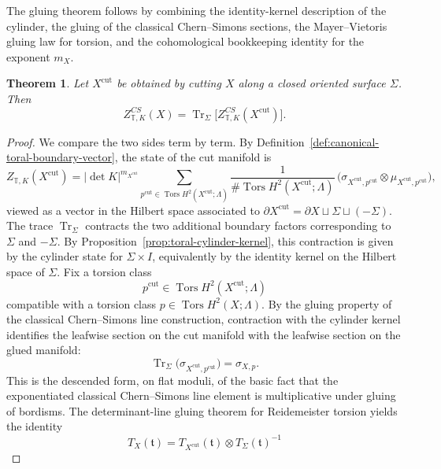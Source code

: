 \documentclass[12pt]{amsart}
\numberwithin{equation}{section}
\newtheorem{theorem}{Theorem}[section]
\DeclareMathOperator{\Tr}{Tr}
\begin{document}
The gluing theorem follows by combining the identity-kernel description of the cylinder, the gluing of the
classical Chern--Simons sections, the Mayer--Vietoris gluing law for torsion, and the cohomological
bookkeeping identity for the exponent $m_X$.

\begin{theorem}
\label{thm:Componentwise-toral-gluing}
Let $X^{\mathrm{cut}}$ be obtained by cutting $X$ along a closed oriented
surface $\Sigma$.
Then
\[
Z^{CS}_{\mathbb T,K}(X)
=
\Tr_\Sigma\!\bigl[
Z^{CS}_{\mathbb T,K}(X^{\mathrm{cut}})
\bigr].
\]
\end{theorem}


\begin{proof}
We compare the two sides term by term. By Definition~\ref{def:canonical-toral-boundary-vector}, the state of the cut manifold is
\[
Z_{\mathbb T,K}(X^{\mathrm{cut}})
=
|\det K|^{m_{X^{\mathrm{cut}}}}
\sum_{p^{\mathrm{cut}}\in \operatorname{Tors}H^2(X^{\mathrm{cut}};\Lambda)}
\frac{1}{\#\operatorname{Tors}H^2(X^{\mathrm{cut}};\Lambda)}
\,
\bigl(\sigma_{X^{\mathrm{cut}},p^{\mathrm{cut}}}\otimes
\mu_{X^{\mathrm{cut}},p^{\mathrm{cut}}}\bigr),
\]
viewed as a vector in the Hilbert space associated to $\partial X^{\mathrm{cut}}=\partial X\sqcup \Sigma\sqcup (-\Sigma).$ The trace $\operatorname{Tr}_{\Sigma}$ contracts the two additional boundary factors
corresponding to $\Sigma$ and $-\Sigma$. By
Proposition~\ref{prop:toral-cylinder-kernel}, this contraction is given by the
cylinder state for $\Sigma\times I$, equivalently by the identity kernel on the
Hilbert space of $\Sigma$. Fix a torsion class $$p^{\mathrm{cut}}\in \operatorname{Tors}H^2(X^{\mathrm{cut}};\Lambda)$$
compatible with a torsion class $
p\in \operatorname{Tors}H^2(X;\Lambda).$ By the gluing property of the classical Chern--Simons line construction, contraction with the cylinder
kernel identifies the leafwise section on the cut manifold with the leafwise section on the glued manifold:
\begin{equation}\label{eq:CS-section-gluing}
\operatorname{Tr}_{\Sigma}\!\bigl(\sigma_{X^{\mathrm{cut}},p^{\mathrm{cut}}}\bigr)
=
\sigma_{X,p}.
\end{equation}
This is the descended form, on flat moduli, of the basic fact that the exponentiated classical
Chern--Simons line element is multiplicative under gluing of bordisms.  The determinant-line gluing theorem for Reidemeister torsion yields the identity
\begin{equation}\label{eq:torsion-gluing-main}
T_X(\mathfrak t)
=
T_{X^{\mathrm{cut}}}(\mathfrak t)\otimes T_\Sigma(\mathfrak t)^{-1}

\end{equation}
\end{proof}
\end{document}
